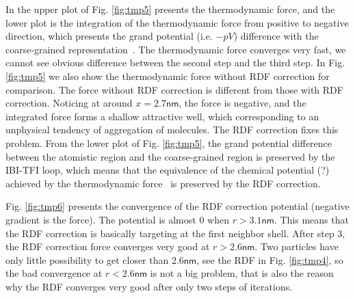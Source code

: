 \documentclass[aps,pre,preprint,unsortedaddress]{revtex4}
\begin{document}
In the upper plot of Fig. \ref{fig:tmp5} presents the thermodynamic
force, and the lower plot is the integration of
the thermodynamic force from positive to negative direction, which
presents the grand potential (i.e. $-pV$) difference with the
coarse-grained representation~\cite{fritsch2011grand}.
The thermodynamic force converges very
fast, we cannot see obvious difference between the second
step and the third step.  In Fig. \ref{fig:tmp5} we also show the
thermodynamic force without RDF correction for comparison. The force
without RDF correction is different from those with RDF
correction. Noticing at around $x=2.7 \textsf{nm}$, the force is
negative, and the integrated force forms a shallow attractive well,
which corresponding to an unphysical tendency of aggregation of molecules. The RDF
correction fixes this problem. From the lower plot of
Fig. \ref{fig:tmp5}, the grand potential difference between the
atomistic region and the coarse-grained region is preserved by the
IBI-TFI loop, which means that the equivalence of the chemical
potential (?) achieved by the thermodynamic
force~\cite{fritsch2011grand} is preserved by the RDF correction.

Fig. \ref{fig:tmp6} presents the convergence of the RDF correction
potential (negative gradient is the force). The potential is almost 0
when $r > 3.1\textsf{nm}$. This means that the RDF correction is
basically targeting at the first neighbor shell. After step 3, the RDF
correction force converges very good at $r > 2.6\textsf{nm}$. Two
particles have only little possibility to get closer than $2.6\textsf{nm}$,
see the RDF in Fig. \ref{fig:tmp4}, so the bad convergence at $r <
2.6\textsf{nm}$ is not a big problem, that is also the reason why the
RDF converges very good after only two steps of iterations.
\end{document}
